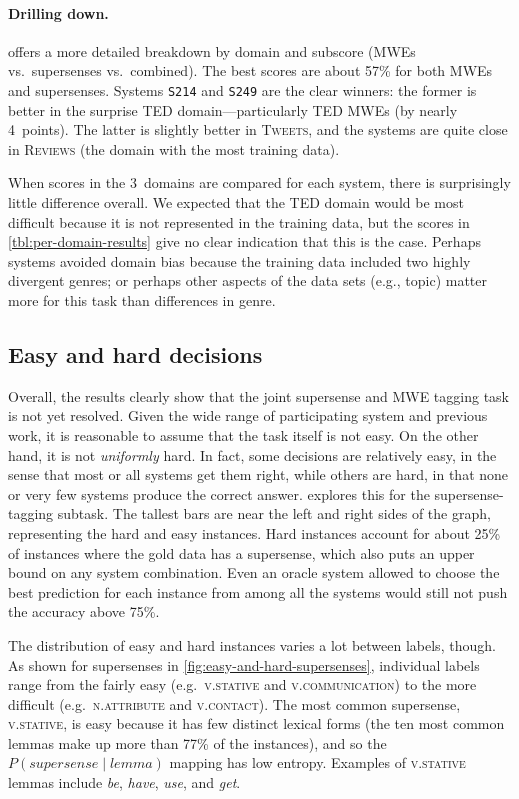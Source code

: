 \documentclass[11pt,letterpaper]{article}
\newcommand{\sys}[1]{\mbox{\texttt{#1}}}   %
\newcommand{\dataset}[1]{\mbox{\textsc{#1}}}	%
\begin{document}
\paragraph{Drilling down.}
 offers a more detailed breakdown by domain and 
subscore (MWEs vs.~supersenses vs.~combined). 
The best scores are about 57\% for both MWEs and supersenses. 
Systems \sys{S214} and \sys{S249} are the clear winners: 
the former is better in the surprise \dataset{TED} domain---particularly TED MWEs (by nearly 4~points).
The latter is slightly better in \dataset{Tweets}, 
and the systems are quite close in \dataset{Reviews} (the domain with the most training data).

When scores in the 3~domains are compared for each system, there is surprisingly little difference overall.
We expected that the \dataset{TED} domain would be most difficult because it is not represented 
in the training data, but the scores in \cref{tbl:per-domain-results} give no clear indication that this is the case. 
Perhaps systems avoided domain bias because the training data included two highly divergent genres; 
or perhaps other aspects of the data sets (e.g., topic) matter more for this task than 
differences in genre.  

\subsection{Easy and hard decisions}

Overall, the results clearly show that the joint supersense and MWE tagging task is not yet resolved. 
Given the wide range of participating system and previous work, it is reasonable to assume that 
the task itself is not easy. On the other hand, it is not \emph{uniformly} hard. 
In fact, some decisions are relatively easy, in the sense that most or all systems get them right, 
while others are hard, in that none or very few systems produce the correct answer. 
 explores this for the supersense-tagging subtask. 
The tallest bars are near the left and right sides of the graph, representing the hard and easy instances. 
Hard instances account for about 25\% of instances where the gold data has a supersense, 
which also puts an upper bound on any system combination. 
Even an oracle system allowed to choose the best prediction for each instance 
from among all the systems would still not push the accuracy above 75\%.

The distribution of easy and hard instances varies a lot between labels, though. 
As shown for supersenses in \cref{fig:easy-and-hard-supersenses}, 
individual labels range from the fairly easy (e.g.\ \textsc{v.stative} and \textsc{v.communication}) 
to the more difficult (e.g.\ \textsc{n.attribute} and \textsc{v.contact}). 
The most common supersense, \textsc{v.stative}, is easy because it has few distinct lexical forms 
(the ten most common lemmas make up more than 77\% of the instances), and so the
$P(\textit{supersense} \mid \textit{lemma})$ mapping has low entropy. 
Examples of \textsc{v.stative} lemmas include \emph{be}, \emph{have}, \emph{use}, and \emph{get}. 
\end{document}
